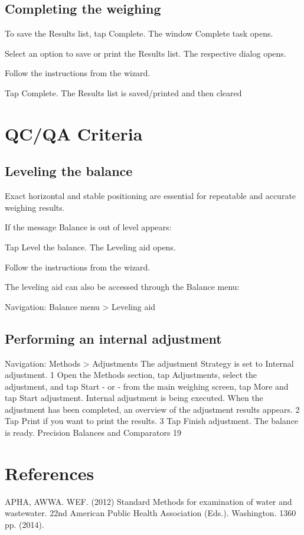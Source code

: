 \documentclass[12pt]{../SOP4_alpha}\usepackage[]{graphicx}\usepackage[]{xcolor}
\begin{document}
\subsection{Completing the weighing}

\NP To save the Results list, tap Complete.
The window Complete task opens.

\NP Select an option to save or print the Results list.
The respective dialog opens.

\NP Follow the instructions from the wizard.

\NP Tap Complete.
The Results list is saved/printed and then cleared



\section{QC/QA Criteria}

\subsection{Leveling the balance}

\NP Exact horizontal and stable positioning are essential for repeatable and accurate weighing results.

If the message Balance is out of level appears:

\NP Tap Level the balance. The Leveling aid opens.
 
\NP Follow the instructions from the wizard.

\NP The leveling aid can also be accessed through the Balance menu:

Navigation: Balance menu > Leveling aid

\subsection{Performing an internal adjustment}

Navigation: Methods > Adjustments
The adjustment Strategy is set to Internal adjustment.
1 Open the Methods section, tap Adjustments, select the adjustment, and tap Start
- or -
from the main weighing screen, tap More and tap Start adjustment.
Internal adjustment is being executed.
When the adjustment has been completed, an overview of the adjustment results appears.
2 Tap Print if you want to print the results.
3 Tap Finish adjustment.
The balance is ready.
Precision Balances and Comparators 19

\section{References}

\NP APHA, AWWA. WEF. (2012) Standard Methods for examination of water and wastewater. 22nd American Public Health Association (Eds.). Washington. 1360 pp. (2014).
\end{document}
